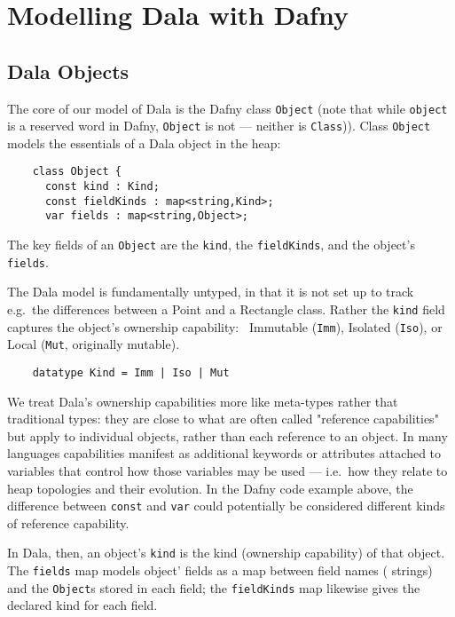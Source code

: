 \section{Modelling Dala with Dafny}

\subsection{Dala Objects}

The core of our model of Dala is the Dafny class \lstinline+Object+ (note that while \lstinline+object+ is a reserved word in Dafny, \lstinline+Object+ is not --- neither is \lstinline+Class+)). Class \lstinline+Object+ models the essentials of a Dala object in the heap:

\begin{lstlisting}
    class Object {  
      const kind : Kind;
      const fieldKinds : map<string,Kind>;
      var fields : map<string,Object>;  
\end{lstlisting}

The key fields of an \lstinline+Object+ are the \lstinline+kind+,
the \lstinline+fieldKinds+, and the object's \lstinline+fields+.

The Dala model is fundamentally untyped, in that it is not set up to track e.g.\ the differences between a Point and a Rectangle class. Rather the 
\lstinline+kind+ field captures the object's ownership capability: \
Immutable (\lstinline+Imm+),
Isolated (\lstinline+Iso+),
or Local (\lstinline+Mut+, originally mutable).

\begin{lstlisting}
    datatype Kind = Imm | Iso | Mut 
\end{lstlisting}

We treat Dala's ownership capabilities more like meta-types rather that traditional types:
they are close to what are often called
"reference capabilities"~\cite{caps-ecoop2001,castegren_reference_2016} but 
apply to individual objects, rather than each reference to an object.
In many languages capabilities manifest as additional keywords or attributes attached to variables that control how those variables may be used --- i.e.\ how they relate to heap topologies and their evolution. In the Dafny code example above, the difference between \lstinline+const+ and \lstinline+var+ could potentially be considered different kinds of reference capability.

In Dala, then, an object's \lstinline+kind+ is the kind (ownership capability) of that object. The \lstinline+fields+ map models object' fields as a map between field names ( strings) and the \lstinline+Object+s stored in each field; the \lstinline+fieldKinds+ map likewise gives the declared kind for each field.

